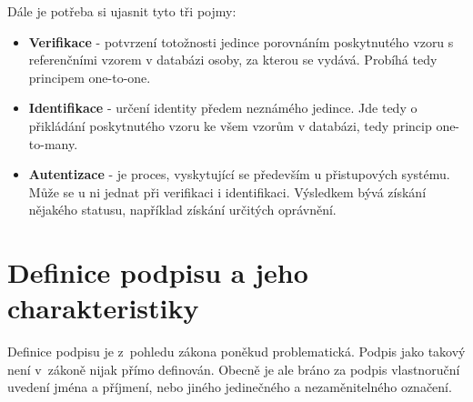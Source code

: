 Dále je potřeba si ujasnit tyto tři pojmy:
\begin{itemize}
  \item{\textbf{Verifikace} - potvrzení totožnosti jedince porovnáním poskytnutého vzoru s referenčními vzorem v databázi osoby,  %
  za kterou se vydává. Probíhá tedy principem one-to-one.}                                                                        %
  \item{\textbf{Identifikace} - určení identity předem neznámého jedince.                                                         %
  Jde tedy o přikládání poskytnutého vzoru ke všem vzorům v databázi, tedy princip one-to-many.}                                  %
  \item{\textbf{Autentizace} - je proces, vyskytující se především u přistupových systému.                                        %
  Může se u ni jednat při verifikaci i identifikaci.                                                                              %
  Výsledkem bývá získání nějakého statusu, například získání určitých oprávnění.}                                                 %
\end{itemize}


\section{Definice podpisu a jeho charakteristiky}
Definice podpisu je z~pohledu zákona poněkud problematická. 
Podpis jako takový není v~zákoně nijak přímo definován. 
Obecně je ale bráno za podpis vlastnoruční uvedení jména a příjmení, nebo jiného jedinečného a nezaměnitelného označení. %


